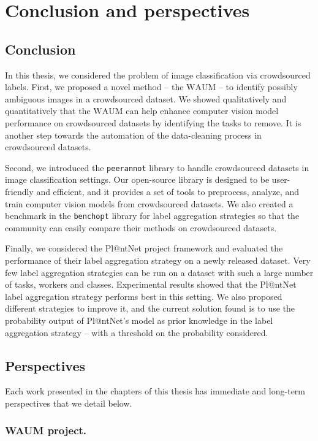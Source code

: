 \chapter{Conclusion and perspectives}

\section{Conclusion}
In this thesis, we considered the problem of image classification via crowdsourced labels.
First, we proposed a novel method -- the $\mathrm{WAUM}$ -- to identify possibly ambiguous images in a crowdsourced dataset.
We showed qualitatively and quantitatively that the $\mathrm{WAUM}$ can help enhance computer vision model performance on crowdsourced datasets by identifying the tasks to remove.
It is another step towards the automation of the data-cleaning process in crowdsourced datasets.

Second, we introduced the \texttt{peerannot} library to handle crowdsourced datasets in image classification settings.
Our open-source library is designed to be user-friendly and efficient, and it provides a set of tools to preprocess, analyze, and train computer vision models from crowdsourced datasets.
We also created a benchmark in the \texttt{benchopt} library for label aggregation strategies so that the community can easily compare their methods on crowdsourced datasets.

Finally, we considered the Pl@ntNet project framework and evaluated the performance of their label aggregation strategy on a newly released dataset.
Very few label aggregation strategies can be run on a dataset with such a large number of tasks, workers and classes.
Experimental results showed that the Pl@ntNet label aggregation strategy performs best in this setting.
We also proposed different strategies to improve it, and the current solution found is to use the probability output of Pl@ntNet's model as prior knowledge in the label aggregation strategy -- with a threshold on the probability considered.

\section{Perspectives}

Each work presented in the chapters of this thesis has immediate and long-term perspectives that we detail below.

\subsection{WAUM project.}

